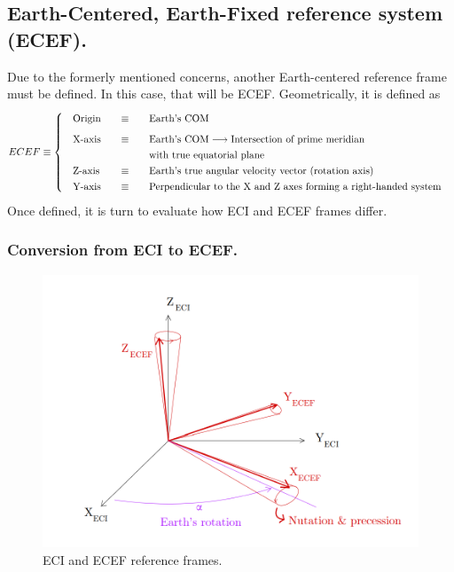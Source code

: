 	\subsection{Earth-Centered, Earth-Fixed reference system (ECEF).}
	\indent Due to the formerly mentioned concerns, another Earth-centered reference frame must be defined. In this case, that will be ECEF. Geometrically, it is defined as \cite{Tapley}
	\[
	\arraycolsep=10pt
	\def\arraystretch{1.3}
	ECEF \equiv\left\{
	\begin{array}{lll}
	\text{Origin} 	& \equiv 	& \text{Earth's COM} \\[0.5 em]
	\text{X-axis} 	& \equiv 	& \text{Earth's COM} \longrightarrow \text{Intersection of prime meridian} \\
					& 			& \text{with true equatorial plane}\\
	\text{Z-axis} 	& \equiv 	& \text{Earth's true angular velocity vector (rotation axis)} \\
	\text{Y-axis} 	& \equiv 	& \text{Perpendicular to the X and Z axes forming a right-handed system} \\
	\end{array}
	\right.
	\]
	\indent Once defined, it is turn to evaluate how ECI and ECEF frames differ.
		\subsubsection{Conversion from ECI to ECEF.}
		\begin{figure}[!htb]
		\centering\includegraphics[width = 0.6\linewidth]{Appendices/Appendix_B/ECI_ECEF}
		\caption{ECI and ECEF reference frames.}
		\label{fig: ECI_ECEF}
		\end{figure}
		\FloatBarrier
